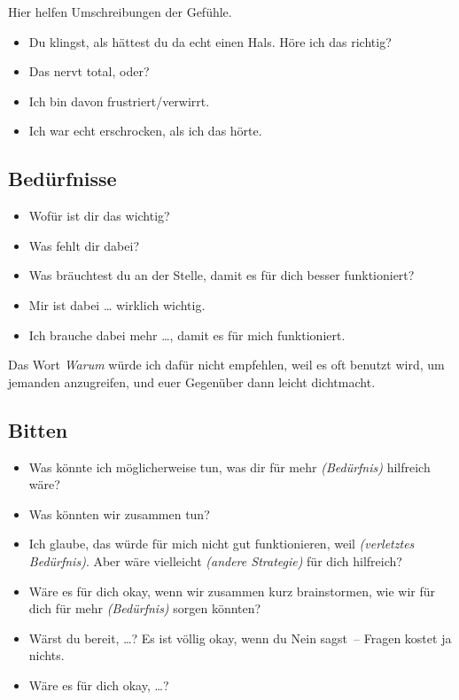 Hier helfen Umschreibungen der Gefühle.

\begin{itemize}
  \item Du klingst, als hättest du da echt einen Hals. Höre ich das richtig?
  \item Das nervt total, oder?
  \item Ich bin davon frustriert/verwirrt.
  \item Ich war echt erschrocken, als ich das hörte.
\end{itemize}


\subsection{Bedürfnisse}

\begin{itemize}
  \item Wofür ist dir das wichtig?
  \item Was fehlt dir dabei?
  \item Was bräuchtest du an der Stelle, damit es für dich besser funktioniert?
  \item Mir ist dabei \ldots{} wirklich wichtig.
  \item Ich brauche dabei mehr \ldots, damit es für mich funktioniert.
\end{itemize}

Das Wort \emph{Warum} würde ich dafür nicht empfehlen, weil es oft benutzt wird, um jemanden anzugreifen, und euer Gegenüber dann leicht dichtmacht.


\subsection{Bitten}

\begin{itemize}
  \item Was könnte ich möglicherweise tun, was dir für mehr \emph{(Bedürfnis)} hilfreich wäre?
  \item Was könnten wir zusammen tun?
  \item Ich glaube, das würde für mich nicht gut funktionieren, weil \emph{(verletztes Bedürfnis)}. Aber wäre vielleicht \emph{(andere Strategie)} für dich hilfreich?
  \item Wäre es für dich okay, wenn wir zusammen kurz brainstormen, wie wir für dich für mehr \emph{(Bedürfnis)} sorgen könnten?
  \item Wärst du bereit, \ldots? Es ist völlig okay, wenn du Nein sagst~-- Fragen kostet ja nichts.
  \item Wäre es für dich okay, \ldots?
\end{itemize}


